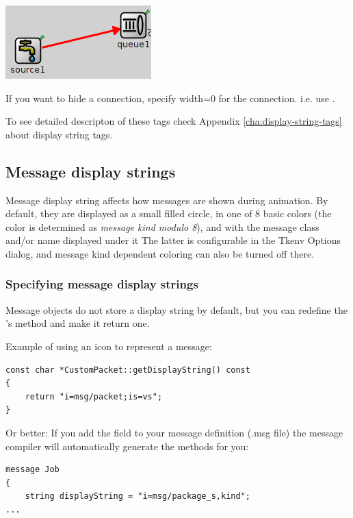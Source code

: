 \begin{center}
\includegraphics{figures/graphics-lstag}
\end{center}

\begin{note}
If you want to hide a connection, specify width=0 for the connection. i.e. use .
\end{note}

To see detailed descripton of these tags check
Appendix \ref{cha:display-string-tags} about display string tags.

\subsection{Message display strings}

Message display string affects how messages are shown during animation.
By default, they are displayed as a small filled circle, in one of
8 basic colors (the color is determined as \textit{message kind modulo 8}),
and with the message class and/or name displayed under it
The latter is configurable in the Tkenv Options dialog, and message kind
dependent coloring can also be turned off there.

\subsubsection{Specifying message display strings}
Message objects do not store a display string by default, but you can redefine
the 's  method and make it return
one.

Example of using an icon to represent a message:
\begin{verbatim}
const char *CustomPacket::getDisplayString() const
{
    return "i=msg/packet;is=vs";
}
\end{verbatim}

Or better: If you add the field  to your message
definition (.msg file) the message compiler will automatically generate
the  methods for you:

\begin{verbatim}
message Job
{
    string displayString = "i=msg/package_s,kind";
...
\end{verbatim}

